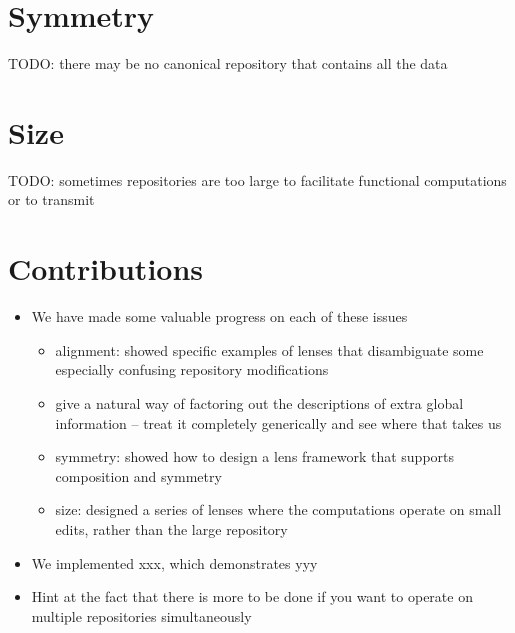 
\section{Symmetry}
\label{sec:intro-symmetry}
TODO: there may be no canonical repository that contains all the data

\section{Size}
\label{sec:intro-size}
TODO: sometimes repositories are too large to facilitate functional
computations or to transmit

\section{Contributions}
\label{sec:intro-contributions}
\begin{itemize}
    \item We have made some valuable progress on each of these issues
        \begin{itemize}
            \item alignment: showed specific examples of lenses that
                disambiguate some especially confusing repository
                modifications
            \item give a natural way of factoring out the descriptions of
                extra global information -- treat it completely generically
                and see where that takes us
            \item symmetry: showed how to design a lens framework that
                supports composition and symmetry
            \item size: designed a series of lenses where the computations
                operate on small edits, rather than the large repository
        \end{itemize}
    \item We implemented xxx, which demonstrates yyy
    \item Hint at the fact that there is more to be done if you want to
        operate on multiple repositories simultaneously
\end{itemize}
